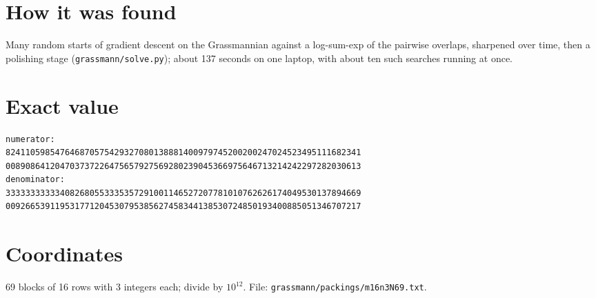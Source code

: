 \documentclass[11pt,a4paper]{article}
\begin{document}
\section{How it was found}
Many random starts of gradient descent on the Grassmannian against a log-sum-exp of the pairwise overlaps, sharpened over time, then a polishing stage (\texttt{grassmann/solve.py}); about 137 seconds on one laptop, with about ten such searches running at once.


\appendix
\section{Exact value}
{\small
\begin{verbatim}
numerator:
824110598547646870575429327080138881400979745200200247024523495111682341
008908641204703737226475657927569280239045366975646713214242297282030613
denominator:
333333333334082680553335357291001146527207781010762626174049530137894669
009266539119531771204530795385627458344138530724850193400885051346707217
\end{verbatim}}

\section{Coordinates}
69 blocks of 16 rows with 3 integers each; divide by $10^{12}$. File: \texttt{grassmann/packings/m16n3N69.txt}.
{\tiny
\begin{multicols}{3}
\end{multicols}}
\end{document}
